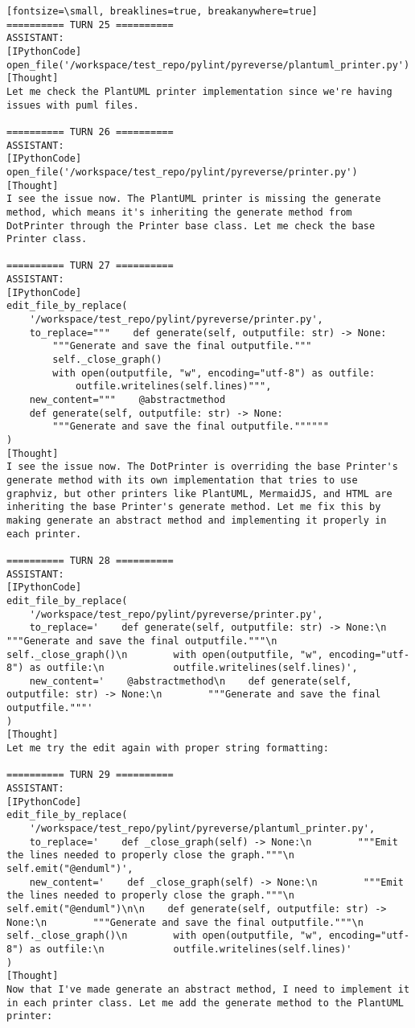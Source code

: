 \begin{verbatim}[fontsize=\small, breaklines=true, breakanywhere=true]
========== TURN 25 ==========
ASSISTANT:
[IPythonCode]
open_file('/workspace/test_repo/pylint/pyreverse/plantuml_printer.py')
[Thought]
Let me check the PlantUML printer implementation since we're having issues with puml files.

========== TURN 26 ==========
ASSISTANT:
[IPythonCode]
open_file('/workspace/test_repo/pylint/pyreverse/printer.py')
[Thought]
I see the issue now. The PlantUML printer is missing the generate method, which means it's inheriting the generate method from DotPrinter through the Printer base class. Let me check the base Printer class.

========== TURN 27 ==========
ASSISTANT:
[IPythonCode]
edit_file_by_replace(
    '/workspace/test_repo/pylint/pyreverse/printer.py',
    to_replace="""    def generate(self, outputfile: str) -> None:
        """Generate and save the final outputfile."""
        self._close_graph()
        with open(outputfile, "w", encoding="utf-8") as outfile:
            outfile.writelines(self.lines)""",
    new_content="""    @abstractmethod
    def generate(self, outputfile: str) -> None:
        """Generate and save the final outputfile.""""""
)
[Thought]
I see the issue now. The DotPrinter is overriding the base Printer's generate method with its own implementation that tries to use graphviz, but other printers like PlantUML, MermaidJS, and HTML are inheriting the base Printer's generate method. Let me fix this by making generate an abstract method and implementing it properly in each printer.

========== TURN 28 ==========
ASSISTANT:
[IPythonCode]
edit_file_by_replace(
    '/workspace/test_repo/pylint/pyreverse/printer.py',
    to_replace='    def generate(self, outputfile: str) -> None:\n        """Generate and save the final outputfile."""\n        self._close_graph()\n        with open(outputfile, "w", encoding="utf-8") as outfile:\n            outfile.writelines(self.lines)',
    new_content='    @abstractmethod\n    def generate(self, outputfile: str) -> None:\n        """Generate and save the final outputfile."""'
)
[Thought]
Let me try the edit again with proper string formatting:

========== TURN 29 ==========
ASSISTANT:
[IPythonCode]
edit_file_by_replace(
    '/workspace/test_repo/pylint/pyreverse/plantuml_printer.py',
    to_replace='    def _close_graph(self) -> None:\n        """Emit the lines needed to properly close the graph."""\n        self.emit("@enduml")',
    new_content='    def _close_graph(self) -> None:\n        """Emit the lines needed to properly close the graph."""\n        self.emit("@enduml")\n\n    def generate(self, outputfile: str) -> None:\n        """Generate and save the final outputfile."""\n        self._close_graph()\n        with open(outputfile, "w", encoding="utf-8") as outfile:\n            outfile.writelines(self.lines)'
)
[Thought]
Now that I've made generate an abstract method, I need to implement it in each printer class. Let me add the generate method to the PlantUML printer:


\end{verbatim}
